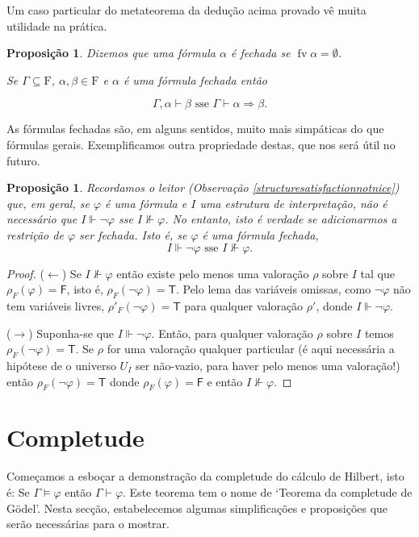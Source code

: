 \documentclass{report}
\newtheorem{prop}{Proposição}
\newtheorem*{prop*}{Proposição}
\theoremstyle{definition}
\theoremstyle{remark}
\newcommand{\F}{\mathrm{F}}
\newcommand{\lt}{\mathsf{T}}
\newcommand{\lf}{\mathsf{F}}
\DeclareMathOperator{\fv}{fv}
\newcommand{\imply}{\mathbin{\Rightarrow}}
\begin{document}
	Um caso particular do metateorema da dedução acima provado vê muita utilidade na prática.
	
	\begin{prop*}
	Dizemos que uma fórmula $\alpha$ é \emph{fechada} se $\fv \alpha = \emptyset$.
	
	Se $\Gamma \subseteq \F$, $\alpha, \beta \in \F$ e $\alpha$ é uma fórmula fechada então
	
	\[\Gamma, \alpha \vdash \beta \text{ sse } \Gamma \vdash \alpha \imply \beta.\]
	\end{prop*}
	
	As fórmulas fechadas são, em alguns sentidos, muito mais simpáticas do que fórmulas gerais. Exemplificamos outra propriedade destas, que nos será útil no futuro.
	
	\begin{prop}\label{fol:closednegnvdash}
	Recordamos o leitor (Observação \ref{structuresatisfactionnotnice}) que, em geral, se $\varphi$ é uma fórmula e $I$ uma estrutura de interpretação, não é necessário que $I \Vdash \neg \varphi$ sse $I \nVdash \varphi$. No entanto, isto é verdade se adicionarmos a restrição de $\varphi$ ser fechada. Isto é, se $\varphi$ é uma fórmula fechada,
	\[I \Vdash \neg \varphi \text{ sse } I \nVdash \varphi.\]
	\end{prop}
	
	\begin{proof}
	($\leftarrow$) Se $I \nVdash \varphi$ então existe pelo menos uma valoração $\rho$ sobre $I$ tal que $\rho_F(\varphi) = \lf$, isto é, $\rho_F(\neg \varphi) = \lt$. Pelo lema das variáveis omissas, como $\neg \varphi$ não tem variáveis livres, $\rho'_F(\neg \varphi) = \lt$ para qualquer valoração $\rho'$, donde $I \Vdash \neg \varphi$.
	
	($\rightarrow$) Suponha-se que $I \Vdash \neg \varphi$. Então, para qualquer valoração $\rho$ sobre $I$ temos $\rho_F(\neg \varphi) = \lt$. Se $\rho$ for uma valoração qualquer particular (é aqui necessária a hipótese de o universo $U_I$ ser não-vazio, para haver pelo menos uma valoração!) então $\rho_F(\neg \varphi) = \lt$ donde $\rho_F(\varphi) = \lf$ e então $I \nVdash \varphi$.
	\end{proof}
	
	\section{Completude}
	
	Começamos a esboçar a demonstração da completude do cálculo de Hilbert, isto é: Se $\Gamma \vDash \varphi$ então $\Gamma \vdash \varphi$. Este teorema tem o nome de `Teorema da completude de Gödel'. Nesta secção, estabelecemos algumas simplificações e proposições que serão necessárias para o mostrar.
	
\end{document}
